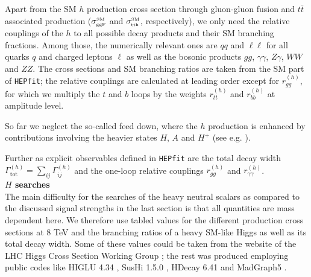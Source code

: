 \documentclass[preprint,3p,12pt]{elsarticle}
\newcommand{\HEPfit}{\texttt{HEPfit}\xspace}
\begin{document}
{Apart from the SM $h$ production cross section through gluon-gluon fusion and $t\bar{t}$ associated production ($\sigma^{\text{\tiny{SM}}}_{\text{\tiny{ggF}}}$ and $\sigma^{\text{\tiny{SM}}}_{\text{\tiny{tth}}}$, respectively), we only need the relative couplings of the $h$ to all possible decay products and their SM branching fractions.
Among those, the numerically relevant ones are $qq$ and $\ell \ell$ for all quarks $q$ and charged leptons $\ell$ as well as the bosonic products $gg$, $\gamma \gamma$, $Z \gamma$, $WW$ and $ZZ$. The cross sections and SM branching ratios are taken from the SM part of \HEPfit; the relative couplings are calculated at leading order except for $r_{gg}^{(h)}$, for which we multiply the $t$ and $b$ loops by the weights $r_{tt}^{(h)}$ and $r_{bb}^{(h)}$ at amplitude level.

So far we neglect the so-called feed down, where the $h$ production is enhanced by contributions involving the heavier states $H$, $A$ and $H^+$ (see e.g. \cite{Dumont:2014wha}).

Further as explicit observables defined in \HEPfit are the total decay width $\Gamma^{(h)}_{\text{tot}}=\sum_{ij}\Gamma_{ij}^{(h)}$ and the one-loop relative couplings $r_{gg}^{(h)}$ and $r_{\gamma \gamma}^{(h)}$.\\

\textbf{$H$ searches}\\

The main difficulty for the searches of the heavy neutral scalars as compared to the discussed signal strengths in the last section is that all quantities are mass dependent here. We therefore use tabled values for the different production cross sections at 8 TeV and the branching ratios of a heavy SM-like Higgs as well as its total decay width. Some of these values could be taken from the website of the LHC Higgs Cross Section Working Group \cite{LHCHXSWG}; the rest was produced employing public codes like HIGLU 4.34 \cite{Spira:1995mt}, SusHi 1.5.0 \cite{Harlander:2012pb}, HDecay 6.41 \cite{Djouadi:1997yw} and MadGraph5 \cite{Alwall:2014hca}.

}
\end{document}
